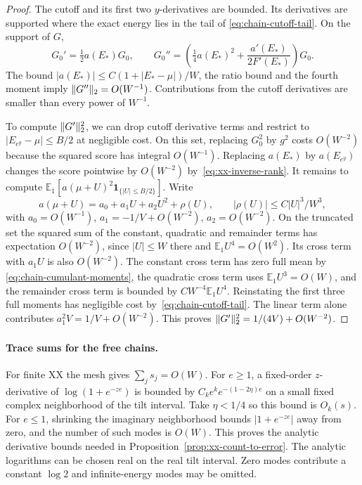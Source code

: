\begin{proof}
The cutoff and its first two $y$-derivatives are bounded. Its
derivatives are supported where the exact energy lies in the tail of
\eqref{eq:chain-cutoff-tail}. On the support of $G$,
\[
 G_0'=\tfrac12 a(E_*)G_0,\qquad
 G_0''=\left(\tfrac14 a(E_*)^2+
                 \frac{a'(E_*)}{2F'(E_*)}\right)G_0.
\]
The bound $|a(E_*)|\le C(1+|E_*-\mu|)/W$, the ratio bound and the
fourth moment imply $\lVert G''\rVert_2=O(W^{-1})$. Contributions from the
cutoff derivatives are smaller than every power of $W^{-1}$.

To compute $\lVert G'\rVert_2^2$, we can drop cutoff derivative terms and
restrict to $|E_{e^y}-\mu|\le B/2$ at negligible cost. On this set,
replacing $G_0^2$ by $g^2$ costs $O(W^{-2})$ because the squared score
has integral $O(W^{-1})$. Replacing $a(E_*)$ by $a(E_{e^y})$ changes
the score pointwise by $O(W^{-2})$ by~\eqref{eq:xx-inverse-rank}.
It remains to compute $\mathbb E_1[a(\mu+U)^2\mathbf1_{\{|U|\le B/2\}}]$.
Write
\[
 a(\mu+U)=a_0+a_1 U+a_2 U^2+\rho(U),\qquad
 |\rho(U)|\le C|U|^3/W^3,
\]
with $a_0=O(W^{-1})$, $a_1=-1/V+O(W^{-2})$, $a_2=O(W^{-2})$.
On the truncated set the squared sum of the constant, quadratic and
remainder terms has expectation $O(W^{-2})$, since $|U|\le W$ there
and $\mathbb E_1 U^4=O(W^2)$. Its cross term with $a_1 U$ is also
$O(W^{-2})$. The constant cross term has zero full mean by
\eqref{eq:chain-cumulant-moments}, the quadratic cross term uses
$\mathbb E_1 U^3=O(W)$, and the remainder cross term is bounded by
$C W^{-4}\mathbb E_1 U^4$. Reinstating the first three full moments
has negligible cost by~\eqref{eq:chain-cutoff-tail}. The linear term
alone contributes $a_1^2 V=1/V+O(W^{-2})$. This proves
$\lVert G'\rVert_2^2=1/(4V)+O(W^{-2})$.
\end{proof}

\paragraph{Trace sums for the free chains.}
For finite XX the mesh gives $\sum_j s_j=O(W)$. For $e\ge1$, a
fixed-order $z$-derivative of $\log(1+e^{-ze})$ is bounded by
$C_k e^k e^{-(1-2\eta)e}$ on a small fixed complex neighborhood
of the tilt interval. Take $\eta<1/4$ so this bound is $O_k(s)$.
For $e\le1$, shrinking the imaginary neighborhood bounds
$|1+e^{-ze}|$ away from zero, and the number of such modes is $O(W)$.
This proves the analytic derivative bounds needed in
Proposition~\ref{prop:xx-count-to-error}. The analytic logarithms can
be chosen real on the real tilt interval. Zero modes contribute a
constant $\log2$ and infinite-energy modes may be omitted.

